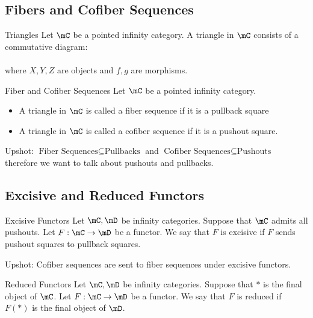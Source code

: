 \documentclass[a4paper]{article}
\begin{document}
\subsection{Fibers and Cofiber Sequences}
\begin{defn}{Triangles}{} Let $\mC$ be a pointed infinity category. A triangle in $\mC$ consists of a commutative diagram: \\
\\
where $X,Y,Z$ are objects and $f,g$ are morphisms. 
\end{defn}

\begin{defn}{Fiber and Cofiber Sequences}{} Let $\mC$ be a pointed infinity category. 
\begin{itemize}
\item A triangle in $\mC$ is called a fiber sequence if it is a pullback square
\item A triangle in $\mC$ is called a cofiber sequence if it is a pushout square. 
\end{itemize}
\end{defn}

Upshot: $\text{Fiber Sequences}\subseteq\text{Pullbacks}$ and $\text{Cofiber Sequences}\subseteq\text{Pushouts}$ therefore we want to talk about pushouts and pullbacks. 

\subsection{Excisive and Reduced Functors}
\begin{defn}{Excisive Functors}{} Let $\mC,\mD$ be infinity categories. Suppose that $\mC$ admits all pushouts. Let $F:\mC\to\mD$ be a functor. We say that $F$ is excisive if $F$ sends pushout squares to pullback squares. 
\end{defn}

Upshot: Cofiber sequences are sent to fiber sequences under excisive functors. 

\begin{defn}{Reduced Functors}{} Let $\mC,\mD$ be infinity categories. Suppose that $\ast$ is the final object of $\mC$. Let $F:\mC\to\mD$ be a functor. We say that $F$ is reduced if $F(\ast)$ is the final object of $\mD$. 
\end{defn}
\end{document}
